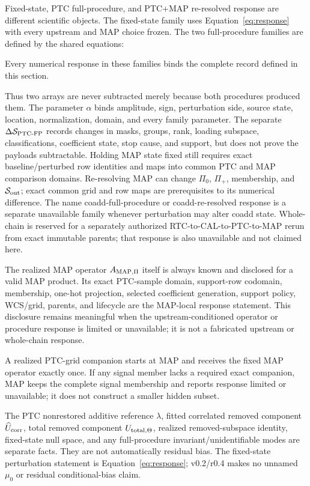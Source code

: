\documentclass[10pt]{article}
\begin{document}
Fixed-state, PTC full-procedure, and PTC+MAP re-resolved response are different
scientific objects. The fixed-state family uses Equation~\eqref{eq:response}
with every upstream and MAP choice frozen. The two full-procedure families are
defined by the shared equations:

\SCIMapProcedureResponseEquations

\SCIMapComparisonSpaceDefinition

Every numerical response in these families binds the complete
\SCIMapComparisonSpaceRecordId{} record defined in this section.

Thus two arrays are never subtracted merely because both procedures produced
them. The parameter \(\alpha\) binds amplitude, sign, perturbation side,
source state, location, normalization, domain, and every family parameter.
The separate \(\Delta\mathcal S_{{\rm PTC}\text{-}{\rm FP}}\) records changes
in masks, groups, rank, loading subspace, classifications, coefficient state,
stop cause, and support, but does not prove the payloads subtractable. Holding
MAP state fixed still requires exact baseline/perturbed row identities and
maps into common PTC and MAP comparison domains. Re-resolving MAP can change
\(\Pi_0\), \(\Pi_+\), membership, and \(\mathcal S_{\rm out}\); exact common
grid and row maps are prerequisites to its numerical difference. The name
coadd-full-procedure or coadd-re-resolved response is a separate unavailable
family whenever perturbation may alter coadd state. Whole-chain is reserved
for a separately authorized RTC-to-CAL-to-PTC-to-MAP rerun from exact immutable
parents; that response is also unavailable and not claimed here.

The realized MAP operator \(A_{{\rm MAP},\Pi}\) itself is always known and
disclosed for a valid MAP product. Its exact PTC-sample domain, support-row
codomain, membership, one-hot projection, selected coefficient generation,
support policy, WCS/grid, parents, and lifecycle are the MAP-local response
statement. This disclosure remains meaningful when the upstream-conditioned
operator or procedure response is limited or unavailable; it is not a
fabricated upstream or whole-chain response.

A realized PTC-grid companion starts at MAP and receives the fixed MAP
operator exactly once. If any signal member lacks a required exact companion,
MAP keeps the complete signal membership and reports response limited or
unavailable; it does not construct a smaller hidden subset.

The PTC nonrestored additive reference \(\lambda\), fitted correlated removed
component \(\widehat U_{\rm corr}\), total removed component
\(U_{{\rm total},\Theta}\), realized removed-subspace identity, fixed-state
null space, and any full-procedure invariant/unidentifiable modes are separate
facts. They are not automatically residual bias. The fixed-state perturbation
statement is Equation~\eqref{eq:response}; v0.2/r0.4 makes no unnamed \(\mu_0\) or
residual conditional-bias claim.
\end{document}
